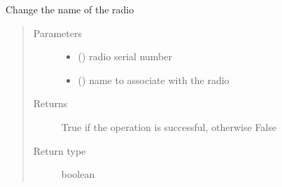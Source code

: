 \documentclass[letterpaper,10pt,english]{sphinxmanual}
\begin{document}
\begin{fulllineitems}
\label{\detokenize{index:controller.utility.update_radio_name}}
Change the name of the radio
\begin{quote}\begin{description}
\item[{Parameters}] \leavevmode\begin{itemize}
\item {} 
 () \textendash{} radio serial number

\item {} 
 () \textendash{} name to associate with the radio

\end{itemize}

\item[{Returns}] \leavevmode
True if the operation is successful, otherwise False

\item[{Return type}] \leavevmode
boolean

\end{description}\end{quote}

\end{fulllineitems}

\end{document}
